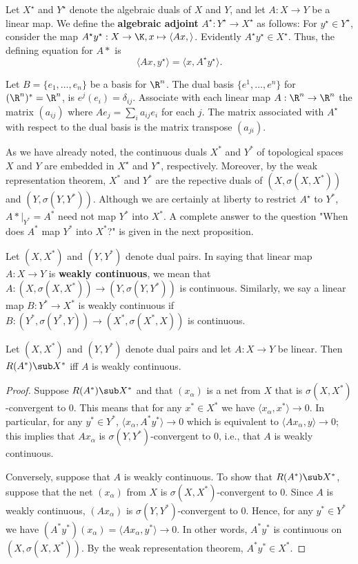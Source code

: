 Let $X^{\star}$ and $Y^{\star}$ denote the algebraic duals of $X$ and $Y$, and let $A:X\to Y$ be a linear map. We define the \textbf{algebraic adjoint} $A^{\star}:Y^{\star}\to X^{\star}$ as follows: For $y^{\star}\in Y^{\star}$, consider the map $A^{\star}y^{\star}:X\to\K,x\mapsto\langle Ax,\rangle$. Evidently $A^{\star}y^{\star}\in X^{\star}$. Thus, the defining equation for $A*$ is
\[\langle Ax,y^{\star}\rangle=\langle x,A^{\star}y^{\star}\rangle.\]
\begin{example}
Let $B=\{e_1,\dots,e_n\}$ be a basis for $\R^n$. The dual basis $\{e^1,\dots,e^n\}$ for $(\R^n)^*=\R^n$, is $e^j(e_i)=\delta_{ij}$. Associate with each linear map $A:\R^n\to\R^n$ the matrix $(a_{ij})$ where $Ae_j=\sum_{i}a_{ij}e_i$ for each $j$. The matrix associated with $A^{\star}$ with respect to the dual basis is the matrix transpose $(a_{ji})$.
\end{example}
As we have already noted, the continuous duals $X^*$ and $Y^*$ of topological spaces $X$ and $Y$ are embedded in $X^{\star}$ and $Y^{\star}$, respectively. Moreover, by the weak representation theorem, $X^*$ and $Y^*$ are the repective duals of $(X,\sigma(X,X^*))$ and $(Y,\sigma(Y,Y^*))$. Although we are certainly at liberty to restrict $A^{\star}$ to $Y^*$, $A*|_{Y^*}=A^*$ need not map $Y^*$ into $X^*$. A complete answer to the question "When does $A^*$ map $Y^*$ into $X^*$?" is given in the next proposition.
\begin{definition}
Let $(X,X^*)$ and $(Y,Y^*)$ denote dual pairs. In saying that linear map $A:X\to Y$ is \textbf{weakly continuous}, we mean that $A:(X,\sigma(X,X^*))\to(Y,\sigma(Y,Y^*))$ is continuous. Similarly, we say a linear map $B:Y^*\to X^*$ is weakly continuous if $B:(Y^*,\sigma(Y^*,Y))\to(X^*,\sigma(X^*,X))$ is continuous.
\end{definition}
\begin{proposition}\label{ajoint in continuous dual iff weak continuous}
Let $(X,X^*)$ and $(Y,Y^*)$ denote dual pairs and let $A:X\to Y$ be linear. Then $R(A^*)\sub X^*$ iff $A$ is weakly continuous.
\end{proposition}
\begin{proof}
Suppose $R(A^*)\sub X^*$ and that $(x_\alpha)$ is a net from $X$ that is $\sigma(X,X^*)$-convergent to $0$. This means that for any $x^*\in X^*$ we have $\langle x_\alpha,x^*\rangle\to 0$. In particular, for any $y^*\in Y^*$, $\langle x_\alpha,A^*y^*\rangle\to 0$ which is equivalent to $\langle Ax_\alpha,y\rangle\to 0$; this implies that $Ax_\alpha$ is $\sigma(Y,Y^*)$-convergent to $0$, i.e., that $A$ is weakly continuous.\par
Conversely, suppose that $A$ is weakly continuous. To show that $R(A^*)\sub X^*$, suppose that the net $(x_\alpha)$ from $X$ is $\sigma(X,X^*)$-convergent to $0$. Since $A$ is weakly continuous, $(Ax_\alpha)$ is $\sigma(Y,Y^*)$-convergent to $0$. Hence, for any $y^*\in Y^*$ we have $(A^*y^*)(x_\alpha)=\langle Ax_\alpha,y^*\rangle\to 0$. In other words, $A^*y^*$ is continuous on $(X,\sigma(X,X^*))$. By the weak representation theorem, $A^*y^*\in X^*$.
\end{proof}
